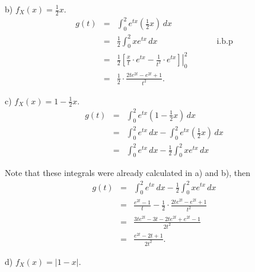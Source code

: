 \documentclass[12pt]{article}
\begin{document}
    \noindent b) $f_X(x) = \frac{1}{2}x$.
	\begin{eqnarray*}
		g(t) &=& \int_{0}^{2} e^{tx} \left(\frac{1}{2} x \right)\, dx \\
		&=& \frac{1}{2} \int_{0}^{2} xe^{tx} \, dx \hspace{3cm} \text{i.b.p} \\
		&=& \frac{1}{2} \left. \left[ \frac{x}{t} \cdot e^{tx} - \frac{1}{t^2} \cdot e^{tx}\right] \right|_{0}^{2} \\
		&=& \frac{1}{2} \cdot \frac{2te^{2t} - e^{2t} + 1}{t^2}.
	\end{eqnarray*}

	\noindent c) $f_X (x) = 1 - \frac{1}{2}x$.
	\begin{eqnarray*}
		g(t) &=& \int_{0}^{2} e^{tx} \left( 1 - \frac{1}{2}x \right)\, dx \\
		&=& \int_{0}^{2} e^{tx} \, dx - \int_{0}^{2} e^{tx} \left(\frac{1}{2} x \right)\, dx \\
		&=& \int_{0}^{2} e^{tx} \, dx - \frac{1}{2} \int_{0}^{2} xe^{tx} \, dx 
	\end{eqnarray*}

	Note that these integrals were already calculated in a) and b), then
	\begin{eqnarray*}
		g(t) &=& \int_{0}^{2} e^{tx} \, dx - \frac{1}{2} \int_{0}^{2} xe^{tx} \, dx \\
		&=& \frac{e^{2t}-1}{t} - \frac{1}{2} \cdot \frac{2te^{2t} - e^{2t} + 1}{t^2} \\
		&=& \frac{3te^{2t} - 3t - 2te^{2t} + e^{2t} - 1}{2t^2} \\
		&=& \frac{e^{2t} - 2t + 1}{2t^2}.
	\end{eqnarray*}

	\noindent d) $f_X (x) = |1 - x|$.
\end{document}
